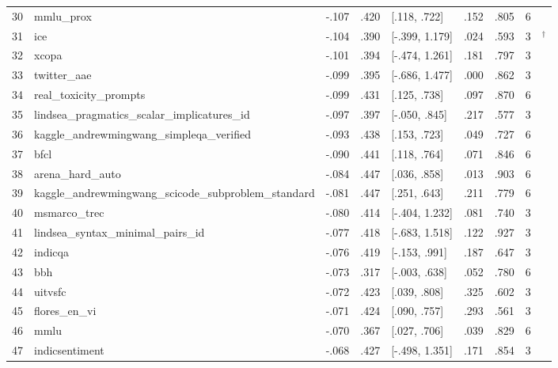 \begin{longtable}{@{}r>{\raggedright\arraybackslash}p{}rrlrrr>{\raggedright\arraybackslash}p{}@{}}
30 & mmlu\_prox & -.107 & .420 & [.118, .722] & .152 & .805 & 6 & \citealp{xuan2025mmlu} \\
31 & ice & -.104 & .390 & [-.399, 1.179] & .024 & .593 & 3 & \citealp{helm2023}$^\dagger$ \\
32 & xcopa & -.101 & .394 & [-.474, 1.261] & .181 & .797 & 3 & \citealp{ponti2020xcopa} \\
33 & twitter\_aae & -.099 & .395 & [-.686, 1.477] & .000 & .862 & 3 & \citealp{blodgett2016demographic} \\
34 & real\_toxicity\_prompts & -.099 & .431 & [.125, .738] & .097 & .870 & 6 & \citealp{gehman2020realtoxicityprompts} \\
35 & lindsea\_pragmatics\_scalar\_implicatures\_id & -.097 & .397 & [-.050, .845] & .217 & .577 & 3 & \citealp{leong2023bhasa} \\
36 & kaggle\_andrewmingwang\_simpleqa\_verified & -.093 & .438 & [.153, .723] & .049 & .727 & 6 & \citealp{haas2025simpleqa} \\
37 & bfcl & -.090 & .441 & [.118, .764] & .071 & .846 & 6 & \citealp{bfcl_leaderboard} \\
38 & arena\_hard\_auto & -.084 & .447 & [.036, .858] & .013 & .903 & 6 & \citealp{li2024from} \\
39 & kaggle\_andrewmingwang\_scicode\_subproblem\_standard & -.081 & .447 & [.251, .643] & .211 & .779 & 6 & \citealp{tian2024scicode} \\
40 & msmarco\_trec & -.080 & .414 & [-.404, 1.232] & .081 & .740 & 3 & \citealp{campos2016ms} \\
41 & lindsea\_syntax\_minimal\_pairs\_id & -.077 & .418 & [-.683, 1.518] & .122 & .927 & 3 & \citealp{leong2023bhasa} \\
42 & indicqa & -.076 & .419 & [-.153, .991] & .187 & .647 & 3 & \citealp{doddapaneni2022leaving} \\
43 & bbh & -.073 & .317 & [-.003, .638] & .052 & .780 & 6 & \citealp{suzgun2022challenging} \\
44 & uitvsfc & -.072 & .423 & [.039, .808] & .325 & .602 & 3 & \citealp{nguyen2018uit} \\
45 & flores\_en\_vi & -.071 & .424 & [.090, .757] & .293 & .561 & 3 & \citealp{costajussa2022no} \\
46 & mmlu & -.070 & .367 & [.027, .706] & .039 & .829 & 6 & \citealp{hendrycks2021} \\
47 & indicsentiment & -.068 & .427 & [-.498, 1.351] & .171 & .854 & 3 & \citealp{doddapaneni2022leaving} \\

\end{longtable}
